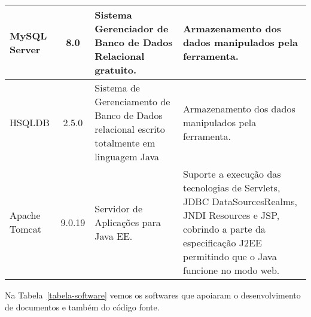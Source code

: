 \begin{table}[h]
\begin{tabular}{|p{1.6cm}|c|p{5cm}|p{6.5cm}|}
		
		MySQL Server & 8.0 & Sistema Gerenciador de Banco de Dados Relacional gratuito. & Armazenamento dos dados manipulados pela ferramenta. \\\hline

		HSQLDB & 2.5.0 & Sistema de Gerenciamento de Banco de Dados relacional escrito totalmente em linguagem Java & Armazenamento dos dados manipulados pela ferramenta. \\\hline
		
		Apache Tomcat & 9.0.19 & Servidor de Aplicações para Java EE. & Suporte a execução das tecnologias de Servlets, JDBC DataSourcesRealms, JNDI Resources e JSP, cobrindo a parte da especificação J2EE permitindo que o Java funcione no modo web. \\\hline
		
	\end{tabular}
\end{table}







\newpage
Na Tabela~\ref{tabela-software} vemos os softwares que apoiaram o desenvolvimento de documentos e também do código fonte.

